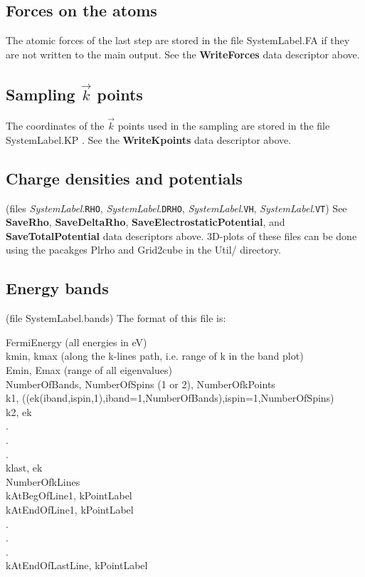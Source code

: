 \documentclass[11pt]{article}
\begin{document}
\subsection{Forces on the atoms}
The atomic forces of the last step are stored in the file
SystemLabel.FA if they are not written to the main output.
See the {\bf WriteForces} data descriptor above.


\subsection{Sampling $\vec k$ points}
The coordinates of the $\vec k$ points used in the sampling
are stored in the file SystemLabel.KP .
See the {\bf WriteKpoints} data descriptor above.


\subsection{Charge densities and potentials}
(files {\it SystemLabel}.{\tt RHO}, {\it SystemLabel}.{\tt DRHO}, 
{\it SystemLabel}.{\tt VH}, {\it SystemLabel}.{\tt VT}) 
See {\bf SaveRho}, {\bf SaveDeltaRho}, {\bf SaveElectrostaticPotential},
and {\bf SaveTotalPotential} data descriptors above.
3D-plots of these files can be done using the pacakges
{\sc Plrho} and {\sc Grid2cube}
 in the Util/
directory.


\subsection{Energy bands}
(file SystemLabel.bands) The format of this file is:

\noindent
FermiEnergy (all energies in eV) \\
kmin, kmax (along the k-lines path, i.e. range of k in the band plot) \\
Emin, Emax (range of all eigenvalues) \\
NumberOfBands, NumberOfSpins (1 or 2), NumberOfkPoints \\
k1, ((ek(iband,ispin,1),iband=1,NumberOfBands),ispin=1,NumberOfSpins) \\
k2, ek \\
 . \\
 . \\
 . \\
klast, ek \\
NumberOfkLines \\
kAtBegOfLine1, kPointLabel \\
kAtEndOfLine1, kPointLabel \\
  . \\
  . \\
  . \\
kAtEndOfLastLine, kPointLabel \\
\end{document}

